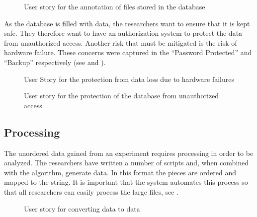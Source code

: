 \begin{figure}[h]
\caption{User story for the annotation of files stored in the database}
\label{fig:target_annotation}
\end{figure}

As the database is filled with data, the researchers want to ensure that it is kept safe. They therefore want to have an authorization system to protect the data from unauthorized access. Another risk that must be mitigated is the risk of hardware failure. These concerns were captured in the  ``Password Protected'' and ``Backup'' respectively (see  and ).

\begin{figure}[h]
\caption{User Story for the protection from data loss due to hardware failures}
\label{fig:target_backup}
\end{figure}

\begin{figure}[h]
\caption{User story for the protection of the database from unauthorized access}
\label{fig:target_password}
\end{figure}
\FloatBarrier

\subsection{Processing}
The unordered  data gained from an experiment requires processing in order to be analyzed. The researchers have written a number of scripts and, when combined with the  algorithm, generate  data. In this format the  pieces are ordered and mapped to the  string. It is important that the system automates this process so that all researchers can easily process the large  files, see . 

\begin{figure}[h]
\caption{User story for converting  data to  data}
\label{fig:target_r2p}
\end{figure}

